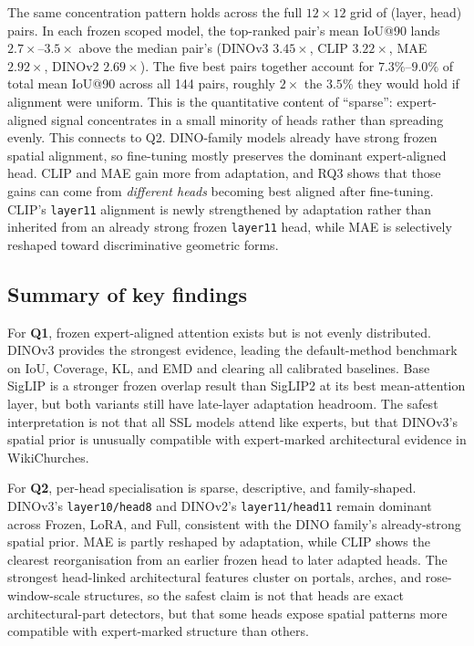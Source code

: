 \documentclass[lineno,pdflatex,sn-mathphys-num]{sn-jnl}%
\theoremstyle{thmstyleone}%
\theoremstyle{thmstyletwo}%
\theoremstyle{thmstylethree}%
\begin{document}
The same concentration pattern holds across the full $12 \times 12$ grid of (layer, head) pairs. In each frozen scoped model, the top-ranked pair's mean IoU@90 lands $2.7\times$--$3.5\times$ above the median pair's (DINOv3 $3.45\times$, CLIP $3.22\times$, MAE $2.92\times$, DINOv2 $2.69\times$). The five best pairs together account for $7.3\%$--$9.0\%$ of total mean IoU@90 across all 144 pairs, roughly $2\times$ the $3.5\%$ they would hold if alignment were uniform. This is the quantitative content of ``sparse'': expert-aligned signal concentrates in a small minority of heads rather than spreading evenly. This connects to Q2. DINO-family models already have strong frozen spatial alignment, so fine-tuning mostly preserves the dominant expert-aligned head. CLIP and MAE gain more from adaptation, and RQ3 shows that those gains can come from \emph{different heads} becoming best aligned after fine-tuning. CLIP's \texttt{layer11} alignment is newly strengthened by adaptation rather than inherited from an already strong frozen \texttt{layer11} head, while MAE is selectively reshaped toward discriminative geometric forms.


\subsection{Summary of key findings}

For \textbf{Q1}, frozen expert-aligned attention exists but is not evenly distributed. DINOv3 provides the strongest evidence, leading the default-method benchmark on IoU, Coverage, KL, and EMD and clearing all calibrated baselines. Base SigLIP is a stronger frozen overlap result than SigLIP2 at its best mean-attention layer, but both variants still have late-layer adaptation headroom. The safest interpretation is not that all SSL models attend like experts, but that DINOv3's spatial prior is unusually compatible with expert-marked architectural evidence in WikiChurches.

For \textbf{Q2}, per-head specialisation is sparse, descriptive, and family-shaped. DINOv3's \texttt{layer10/head8} and DINOv2's \texttt{layer11/head11} remain dominant across Frozen, LoRA, and Full, consistent with the DINO family's already-strong spatial prior. MAE is partly reshaped by adaptation, while CLIP shows the clearest reorganisation from an earlier frozen head to later adapted heads. The strongest head-linked architectural features cluster on portals, arches, and rose-window-scale structures, so the safest claim is not that heads are exact architectural-part detectors, but that some heads expose spatial patterns more compatible with expert-marked structure than others.
\end{document}
